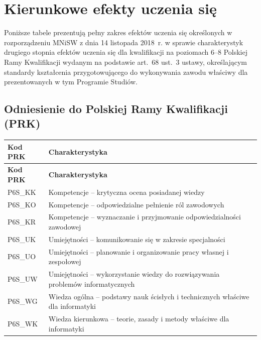 \documentclass[12pt,a4paper]{article}
\newcommand{\thdrule}{\noalign{\global\setlength{\extrarowheight}{0pt}}}
\newcommand{\thdend}{\noalign{\global\setlength{\extrarowheight}{4pt}}}
\begin{document}
\newpage

\section{Kierunkowe efekty uczenia się}

Poniższe tabele prezentują pełny zakres efektów uczenia się określonych w rozporządzeniu MNiSW z dnia 14 listopada 2018~r. w sprawie charakterystyk drugiego stopnia efektów uczenia się dla kwalifikacji na poziomach 6--8 Polskiej Ramy Kwalifikacji wydanym na podstawie art.~68 ust.~3 ustawy, określającym standardy kształcenia przygotowującego do wykonywania zawodu właściwy dla prezentowanych w tym Programie Studiów.

\subsection*{Odniesienie do Polskiej Ramy Kwalifikacji (PRK)}

{\scriptsize
\begin{longtable}{m{2.8cm}m{12cm}}
\thdrule\toprule
\rowcolor{pjatkRed} {\color{white}\footnotesize\textbf{\vphantom{Ag}Kod PRK}} & {\color{white}\footnotesize\textbf{\vphantom{Ag}Charakterystyka}} \\
\midrule\thdend
\endfirsthead
\thdrule\toprule
\rowcolor{pjatkRed} {\color{white}\footnotesize\textbf{\vphantom{Ag}Kod PRK}} & {\color{white}\footnotesize\textbf{\vphantom{Ag}Charakterystyka}} \\
\midrule\thdend
\endhead
\rowcolor{tableRowLight} P6S\_KK & Kompetencje -- krytyczna ocena posiadanej wiedzy \\
\rowcolor{tableRowAlt} P6S\_KO & Kompetencje -- odpowiedzialne pełnienie ról zawodowych \\
\rowcolor{tableRowLight} P6S\_KR & Kompetencje -- wyznaczanie i przyjmowanie odpowiedzialności zawodowej \\
\rowcolor{tableRowAlt} P6S\_UK & Umiejętności -- komunikowanie się w zakresie specjalności \\
\rowcolor{tableRowLight} P6S\_UO & Umiejętności -- planowanie i organizowanie pracy własnej i zespołowej \\
\rowcolor{tableRowAlt} P6S\_UW & Umiejętności -- wykorzystanie wiedzy do rozwiązywania problemów informatycznych \\
\rowcolor{tableRowLight} P6S\_WG & Wiedza ogólna -- podstawy nauk ścisłych i technicznych właściwe dla informatyki \\
\rowcolor{tableRowAlt} P6S\_WK & Wiedza kierunkowa -- teorie, zasady i metody właściwe dla informatyki \\
\bottomrule
\end{longtable}}
\end{document}
